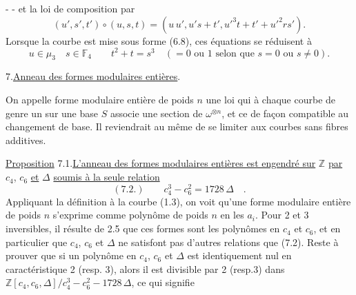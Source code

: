 -  -
et la loi de composition par
\[
(u',s',t')\circ(u,s,t)=(u\,u',u's+t',u'^3t+t'+u'^2rs').
\]
Lorsque la courbe est mise sous forme (6.8), ces équations se réduisent à
\[
u\in\mu_3\quad s\in\mathbb F_4\qquad t^2+t=s^3\quad(=0\text{ ou }1\text{ selon que }s=0\text{ ou }s\ne0).
\]

7.\quad\uline{Anneau des formes modulaires entières}.

On appelle forme modulaire entière de poids $n$ une loi qui à chaque courbe de genre un sur une base $S$ associe une section de $\omega^{\otimes n}$, et ce de façon compatible au changement de base. Il reviendrait au même de se limiter aux courbes sans fibres additives.

\uline{Proposition} 7.1.\quad\uline{L'anneau des formes modulaires entières est engendré sur} $\mathbb Z$ \uline{par} $c_4$, $c_6$ \uline{et} $\Delta$ \uline{soumis à la seule relation}
\[
(7.2.)\qquad c_4^3-c_6^2=1728\,\Delta\quad.
\]
Appliquant la définition à la courbe (1.3), on voit qu'une forme modulaire entière de poids $n$ s'exprime comme polynôme de poids $n$ en les $a_i$. Pour 2 et 3 inversibles, il résulte de 2.5 que ces formes sont les polynômes en $c_4$ et $c_6$, et en particulier que $c_4$, $c_6$ et $\Delta$ ne satisfont pas d'autres relations que (7.2). Reste à prouver que si un polynôme en $c_4$, $c_6$ et $\Delta$ est identiquement nul en caractéristique 2 (resp. 3), alors il est divisible par 2 (resp.3) dans $\mathbb Z[c_4,c_6,\Delta]/c_4^3-c_6^2-1728\,\Delta$, ce qui signifie
